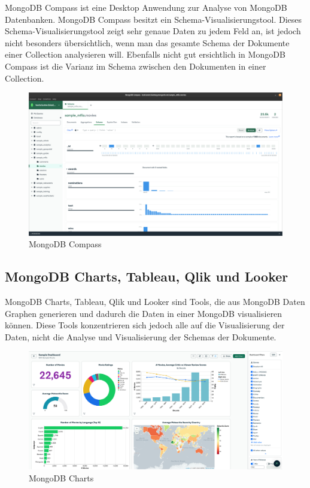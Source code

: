 MongoDB Compass ist eine Desktop Anwendung zur Analyse von MongoDB Datenbanken.
MongoDB Compass besitzt ein Schema-Visualisierungstool.
Dieses Schema-Visualisierungstool zeigt sehr genaue Daten zu jedem Feld an, ist jedoch nicht besonders übersichtlich, wenn man das gesamte Schema der Dokumente einer Collection analysieren will.
Ebenfalls nicht gut ersichtlich in MongoDB Compass ist die Varianz im Schema zwischen den Dokumenten in einer Collection.
\begin{figure}[H]
    \includegraphics[width=\textwidth]{images/mongodb_compass}
    \caption{MongoDB Compass}
    \label{fig:mongodb_compass}
\end{figure}

\subsection{MongoDB Charts, Tableau, Qlik und Looker}
\label{sub:mongodb_charts}

MongoDB Charts, Tableau, Qlik und Looker sind Tools, die aus MongoDB Daten Graphen generieren und dadurch die Daten in einer MongoDB visualisieren können.
Diese Tools konzentrieren sich jedoch alle auf die Visualisierung der Daten, nicht die Analyse und Visualisierung der Schemas der Dokumente.
\begin{figure}[H]
    \includegraphics[width=\textwidth]{images/mongodb_charts}
    \caption{MongoDB Charts}
    \label{fig:mongodb_charts}
\end{figure}
~\autocite{knowi:mongo_vis_tools}

